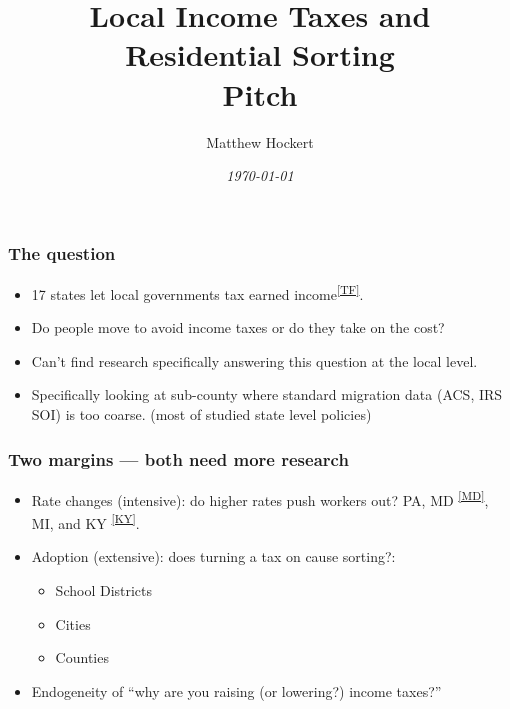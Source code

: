 \documentclass[xcolor = x11names, compress, aspectratio = 169]{beamer}
\newcommand{\src}[2]{\textsuperscript{\href{#1}{\footnotesize[#2]}}}
\begin{document}
\begin{frame}
    \title{Local Income Taxes and Residential Sorting \\
    \large Pitch}
    \author[Hockert]{Matthew Hockert}
    \date{\small{\textit{\today}}}
    \titlepage
\end{frame}

\begin{frame}
\frametitle{The question}
    \begin{itemize}\setlength{\itemsep}{0.3cm}
        \item 17 states let local governments tax earned
        income\src{https://taxfoundation.org/research/all/state/local-income-taxes-2019/}{TF}.
        \item Do people move to avoid income taxes or do they take on the cost?
        \item Can't find research specifically answering this question at the local level. 
        \item Specifically looking at sub-county where standard migration data (ACS, IRS SOI) is too coarse. (most of studied state level policies)
    \end{itemize}
\end{frame}


\begin{frame}
\frametitle{Two margins --- both need more research}
    \begin{itemize}\setlength{\itemsep}{0.3cm}
        \item Rate changes (intensive): do higher rates push workers
        out? PA, MD
        \src{https://www.marylandtaxes.gov/individual/income/tax-info/tax-rates.php}{MD}, MI, and KY
        \src{https://www.klc.org/InfoCentral/Detail/31/occupational-license-tax}{KY}.
        \item Adoption (extensive): does turning a tax on cause
        sorting?:
        \begin{itemize}\setlength{\itemsep}{0.05cm}
            \item School Districts
            \item Cities
            \item Counties
        \end{itemize}
        \item Endogeneity of ``why are you raising (or lowering?) income taxes?''
    \end{itemize}
\end{frame}
\end{document}
